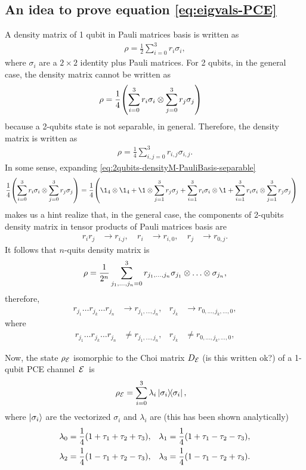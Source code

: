 \subsection{An idea to prove equation \eqref{eq:eigvals-PCE}}
A density matrix of 1 qubit in Pauli matrices basis is written as
\begin{align}
\rho=\frac{1}{2}\sum_{i=0}^3r_i\sigma_i,
\end{align}
where $\sigma_i$ are a $2\times2$ identity plus Pauli matrices.
For 2 qubits, in the general case, the density matrix cannot be written as
\begin{align}\label{eq:2qubits-densityM-PauliBasis-separable}
\rho&=\frac{1}{4}\qty(\sum_{i=0}^3r_i\sigma_i
\otimes
\sum_{j=0}^3r_j\sigma_j)
\end{align}
because a 2-qubits state is not separable, in general. Therefore, 
the density matrix is written as
\begin{align}
\rho=\frac{1}{4}\sum_{i,j=0}^3r_{i,j}\sigma_{i,j}.
\end{align}
In some sense, expanding 
\eqref{eq:2qubits-densityM-PauliBasis-separable}
\begin{align}
\frac{1}{4}\qty(\sum_{i=0}^3r_i\sigma_i
\ot
\sum_{j=0}^3r_j\sigma_j)
&=\frac{1}{4}\qty(
\1_{4}\ot\1_{4}+\1\ot\sum_{j=1}^3r_j\sigma_j+
\sum_{i=1}^3r_i\sigma_i\ot\1+
\sum_{i=1}^3r_i\sigma_i\ot\sum_{j=1}^3r_j\sigma_j
)
\end{align}
makes us a hint realize that, in the general case, the components
of 2-qubits density matrix in tensor products of Pauli matrices basis are
\begin{align}
r_ir_j&\to r_{i.j},&\ r_i&\to r_{i,0},&\ r_j &\to r_{0,j}.
\end{align}
It follows that $n$-quits density matrix is
\begin{align}
\rho=\frac{1}{2^n}\sum_{j_1,\ldots,j_n=0}^3
r_{j_1,\ldots,j_n}\sigma_{j_1}\otimes\ldots\otimes\sigma_{j_n},
\end{align}
therefore,
\begin{align}
\label{eq:general-comp-of-density-matrix-in-Pauli-matrices-basis}
r_{j_1}\ldots r_{j_k}\ldots r_{j_n}&\to r_{j_1,\ldots,j_n}, &
r_{j_k}&\to r_{0,\ldots,j_k,\ldots,0},
\end{align}
where 
\begin{align}
r_{j_1}\ldots r_{j_k}\ldots r_{j_n}&\neq r_{j_1,\ldots,j_n}, &
r_{j_k}&\neq r_{0,\ldots,j_k,\ldots,0},
\end{align}

Now, the state $\rho_{\mathcal{E}}$ isomorphic to the Choi matrix $D_{\mathcal{E}}$
(is this written ok?) of a 1-qubit PCE channel~$\mathcal{E}$~is
\begin{align}
\rho_{\E}&=\sum_{i=0}^3\lambda_i \dyad{\sigma_i}{\sigma_i},
\end{align}
where $\ket{\sigma_i}$ are the vectorized $\sigma_i$ and
$\lambda_i$ are (this has been shown analytically)
\begin{align}\label{eq:eigvals-1q-choi}
\lambda_0&=\frac{1}{4}\qty(1+\tau_1+\tau_2+\tau_3), &
\lambda_1&=\frac{1}{4}\qty(1+\tau_1-\tau_2-\tau_3),\nonumber\\
\lambda_2&=\frac{1}{4}\qty(1-\tau_1+\tau_2-\tau_3), &
\lambda_3&=\frac{1}{4}\qty(1-\tau_1-\tau_2+\tau_3).
\end{align}

